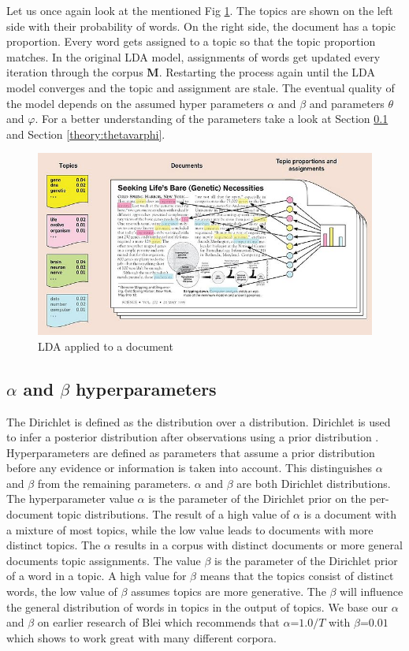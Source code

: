 Let us once again look at the mentioned Fig \ref{fig:LDA_example}. The topics are shown on the left side with their probability of words. On the right side, the document has a topic proportion. Every word gets assigned to a topic so that the topic proportion matches.  
In the original LDA model, assignments of words get updated every iteration through the corpus \textbf{M}. Restarting the process again until the LDA model converges and the topic and assignment are stale. The eventual quality of the model depends on the assumed hyper parameters $\alpha$ and $\beta$ and parameters $\theta$ and $\varphi$. For a better understanding of the parameters take a look at Section \ref{theory:alphabeta} and Section \ref{theory:thetavarphi}.

\begin{figure}
    \centering
    \includegraphics[scale=0.6]{methodology/700px-Illustrating_LDA.jpg}
    \caption{LDA applied to a document \cite{Blei2003}}
    \label{fig:LDA_example}
\end{figure}

\subsection{$\alpha$ and $\beta$ hyperparameters} \label{theory:alphabeta}
The Dirichlet is defined as the distribution over a distribution. Dirichlet is used to infer a posterior distribution after observations using a prior distribution \cite{Sethuraman2001APRIORS}. Hyperparameters are defined as parameters that assume a prior distribution before any evidence or information is taken into account. This distinguishes $\alpha$ and $\beta$ from the remaining parameters. $\alpha$ and $\beta$ are both Dirichlet distributions. The hyperparameter value $\alpha$ is the parameter of the Dirichlet prior on the per-document topic distributions. The result of a high value of $\alpha$ is a document with a mixture of most topics, while the low value leads to documents with more distinct topics. The $\alpha$ results in a corpus with distinct documents or more general documents topic assignments. The value $\beta$ is the parameter of the Dirichlet prior of a word in a topic. A high value for $\beta$ means that the topics consist of distinct words, the low value of $\beta$ assumes topics are more generative. The $\beta$ will influence the general distribution of words in topics in the output of topics. 
We base our $\alpha$ and $\beta$ on earlier research of Blei which recommends that $\alpha $=$ 1.0/T$ with $\beta $=$ 0.01$ which shows to work great with many different corpora.

